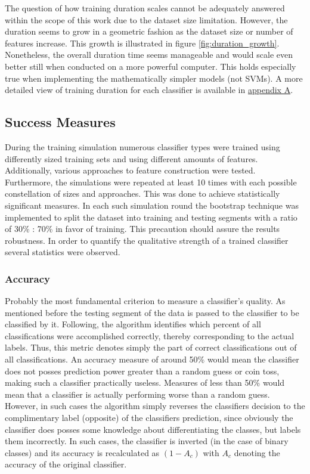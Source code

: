 		\par
		The question of how training duration scales cannot be adequately answered within the scope of this work due to the dataset size limitation. However, the duration seems to grow in a geometric fashion as the dataset size or number of features increase. This growth is illustrated in figure \ref{fig:duration_growth}. Nonetheless, the overall duration time seems manageable and would scale even better still when conducted on a more powerful computer. This holds especially true when implementing the mathematically simpler models (not SVMs). A more detailed view of training duration for each classifier is available in \hyperref[tab:dur_by_type]{appendix A}.
			
	\subsection{Success Measures}
		During the training simulation numerous classifier types were trained using differently sized training sets and using different amounts of features. Additionally, various approaches to feature construction were tested. Furthermore, the simulations were repeated at least 10 times with each possible constellation of sizes and approaches. This was done to achieve statistically significant measures. In each such simulation round the bootstrap technique was implemented to split the dataset into training and testing segments with a ratio of 30\% : 70\% in favor of training. This precaution should assure the results robustness. In order to quantify the qualitative strength of a trained classifier several statistics were observed.
		
		\par
	
		\subsubsection{Accuracy}
			Probably the most fundamental criterion to measure a classifier's quality. As mentioned before the testing segment of the data is passed to the classifier to be classified by it. Following, the algorithm identifies which percent of all classifications were accomplished correctly, thereby corresponding to the actual labels. Thus, this metric denotes simply the part of correct classifications out of all classifications. An accuracy measure of around 50\% would mean the classifier does not posses prediction power greater than a random guess or coin toss, making such a classifier practically useless. Measures of less than 50\% would mean that a classifier is actually performing worse than a random guess. However, in such cases the algorithm simply reverses the classifiers decision to the complimentary label (opposite) of the classifiers prediction, since obviously the classifier does posses some knowledge about differentiating the classes, but labels them incorrectly. In such cases, the classifier is inverted (in the case of binary classes) and its accuracy is recalculated as $ (1-A_c) $ with $ A_c $ denoting the accuracy of the original classifier. 
			
